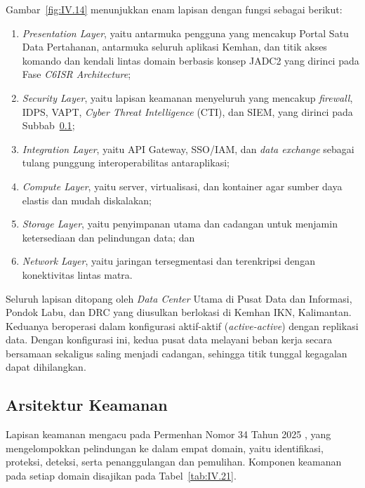 Gambar~\ref{fig:IV.14} menunjukkan enam lapisan dengan fungsi sebagai berikut:
\begin{enumerate}[label=\arabic*.]
\item \textit{Presentation Layer}, yaitu antarmuka pengguna yang mencakup Portal Satu Data Pertahanan, antarmuka seluruh aplikasi Kemhan, dan titik akses komando dan kendali lintas domain berbasis konsep JADC2 yang dirinci pada Fase \textit{C6ISR Architecture};
\item \textit{Security Layer}, yaitu lapisan keamanan menyeluruh yang mencakup \textit{firewall}, IDPS, VAPT, \textit{Cyber Threat Intelligence} (CTI), dan SIEM, yang dirinci pada Subbab~\ref{sec:IV.5.4};
\item \textit{Integration Layer}, yaitu API Gateway, SSO/IAM, dan \textit{data exchange} sebagai tulang punggung interoperabilitas antaraplikasi;
\item \textit{Compute Layer}, yaitu server, virtualisasi, dan kontainer agar sumber daya elastis dan mudah diskalakan;
\item \textit{Storage Layer}, yaitu penyimpanan utama dan cadangan untuk menjamin ketersediaan dan pelindungan data; dan
\item \textit{Network Layer}, yaitu jaringan tersegmentasi dan terenkripsi dengan konektivitas lintas matra.
\end{enumerate}

Seluruh lapisan ditopang oleh \textit{Data Center} Utama di Pusat Data dan Informasi, Pondok Labu, dan DRC yang diusulkan berlokasi di Kemhan IKN, Kalimantan. Keduanya beroperasi dalam konfigurasi aktif-aktif (\textit{active-active}) dengan replikasi data. Dengan konfigurasi ini, kedua pusat data melayani beban kerja secara bersamaan sekaligus saling menjadi cadangan, sehingga titik tunggal kegagalan dapat dihilangkan.

\subsection{Arsitektur Keamanan}
\label{sec:IV.5.4}

Lapisan keamanan mengacu pada Permenhan Nomor 34 Tahun 2025 \cite{Permenhan34Tahun2025}, yang mengelompokkan pelindungan ke dalam empat domain, yaitu identifikasi, proteksi, deteksi, serta penanggulangan dan pemulihan. Komponen keamanan pada setiap domain disajikan pada Tabel~\ref{tab:IV.21}.

